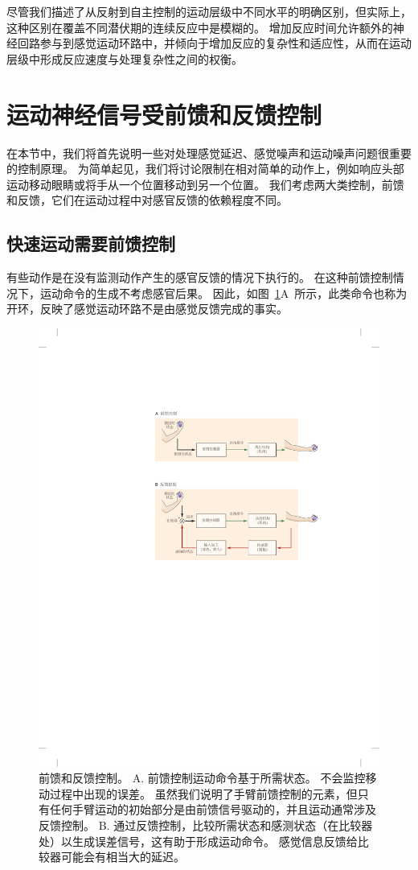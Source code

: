尽管我们描述了从反射到自主控制的运动层级中不同水平的明确区别，但实际上，这种区别在覆盖不同潜伏期的连续反应中是模糊的。
增加反应时间允许额外的神经回路参与到感觉运动环路中，并倾向于增加反应的复杂性和适应性，从而在运动层级中形成反应速度与处理复杂性之间的权衡。

\section{运动神经信号受前馈和反馈控制}

在本节中，我们将首先说明一些对处理感觉延迟、感觉噪声和运动噪声问题很重要的控制原理。
为简单起见，我们将讨论限制在相对简单的动作上，例如响应头部运动移动眼睛或将手从一个位置移动到另一个位置。
我们考虑两大类控制，前馈和反馈，它们在运动过程中对感官反馈的依赖程度不同。



\subsection{快速运动需要前馈控制}

有些动作是在没有监测动作产生的感官反馈的情况下执行的。
在这种前馈控制情况下，运动命令的生成不考虑感官后果。
因此，如图~\ref{fig:30_2}A~所示，此类命令也称为开环，反映了感觉运动环路不是由感觉反馈完成的事实。


\begin{figure}[htbp]
	\centering
	\includegraphics[width=0.75\linewidth]{chap30/fig_30_2}
	\caption{前馈和反馈控制。
		A. 前馈控制运动命令基于所需状态。
		不会监控移动过程中出现的误差。
		虽然我们说明了手臂前馈控制的元素，但只有任何手臂运动的初始部分是由前馈信号驱动的，并且运动通常涉及反馈控制。
		B. 通过反馈控制，比较所需状态和感测状态（在比较器处）以生成误差信号，这有助于形成运动命令。
		感觉信息反馈给比较器可能会有相当大的延迟。}
	\label{fig:30_2}
\end{figure}


